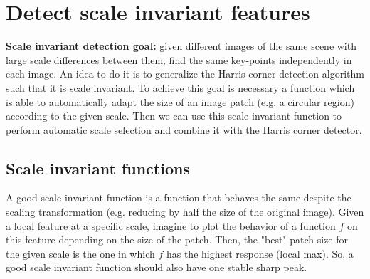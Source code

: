 \section{Detect scale invariant features}
\label{section:scale_inv_features}
\textbf{Scale invariant detection goal:} given different images of the same scene with large scale differences between them, find the same key-points independently in each image.\newline\newline
An idea to do it is to generalize the Harris corner detection algorithm such that it is scale invariant. To achieve this goal is necessary a function which is able to automatically adapt the size of an image patch (e.g. a circular region) according to the given scale. Then we can use this scale invariant function to perform automatic scale selection and combine it with the Harris corner detector. 

\subsection{Scale invariant functions}
A good scale invariant function is a function that behaves the same despite the scaling transformation (e.g. reducing by half the size of the original image). Given a local feature at a specific scale, imagine to plot the behavior of a function $f$ on this feature depending on the size of the patch. Then, the "best" patch size for the given scale is the one in which $f$ has the highest response (local max).\newline\newline
So, a good scale invariant function should also have one stable sharp peak.
